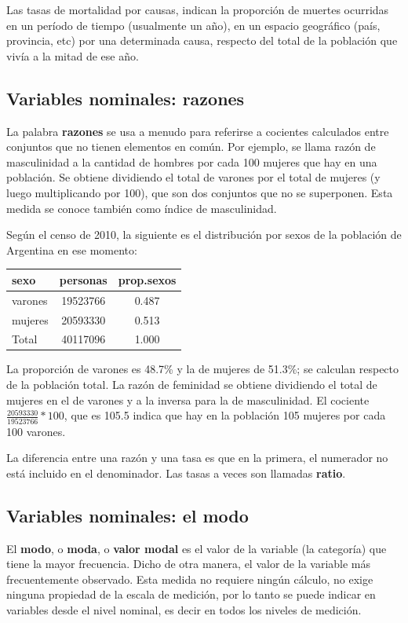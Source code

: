 \documentclass[]{book}
\begin{document}
Las tasas de mortalidad por causas, indican la proporción de muertes ocurridas en un período de tiempo (usualmente un año), en un espacio geográfico (país, provincia, etc) por una determinada causa, respecto del total de la población que vivía a la mitad de ese año.

\hypertarget{variables-nominales-razones}{%
\subsection{Variables nominales: razones}\label{variables-nominales-razones}}

La palabra \textbf{razones} se usa a menudo para referirse a cocientes
calculados entre conjuntos que no tienen elementos en común. Por
ejemplo, se llama razón de masculinidad a la cantidad de hombres por
cada 100 mujeres que hay en una población. Se obtiene dividiendo el
total de varones por el total de mujeres (y luego multiplicando por
100), que son dos conjuntos que no se superponen. Esta medida se conoce también como índice de masculinidad.

Según el censo de 2010, la siguiente es el distribución por sexos de la población de Argentina en ese momento:

\begin{longtable}[]{@{}lcc@{}}
\toprule
sexo & personas & prop.sexos\tabularnewline
\midrule
\endhead
varones & 19523766 & 0.487\tabularnewline
mujeres & 20593330 & 0.513\tabularnewline
Total & 40117096 & 1.000\tabularnewline
\bottomrule
\end{longtable}

La proporción de varones es 48.7\% y la de mujeres de 51.3\%; se calculan respecto de la población total. La razón de feminidad se obtiene dividiendo el total de mujeres en el de varones y a la inversa para la de masculinidad. El cociente \(\frac{20593330}{19523766}*100\), que es 105.5 indica que hay en la población 105 mujeres por cada 100 varones.

La diferencia entre una razón y una tasa es que en la primera, el numerador no está incluido en el denominador. Las tasas a veces son llamadas \textbf{ratio}.

\hypertarget{variables-nominales-el-modo}{%
\subsection{Variables nominales: el modo}\label{variables-nominales-el-modo}}

El \textbf{modo}, o \textbf{moda}, o \textbf{valor modal} es el valor de la variable
(la categoría) que tiene la mayor frecuencia. Dicho de otra manera, el valor de la variable más frecuentemente observado. Esta medida no requiere ningún cálculo, no exige ninguna propiedad de la escala de
medición, por lo tanto se puede indicar en variables desde el nivel
nominal, es decir en todos los niveles de medición.
\end{document}
